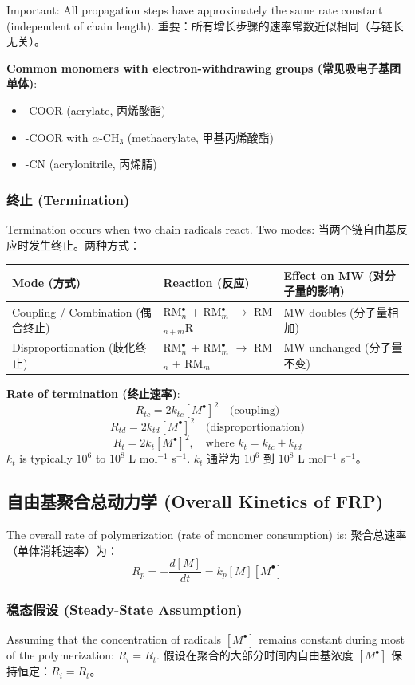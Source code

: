\documentclass[12pt,a4paper]{ctexart}
\begin{document}
Important: All propagation steps have approximately the same rate constant (independent of chain length).  
重要：所有增长步骤的速率常数近似相同（与链长无关）。

\textbf{Common monomers with electron-withdrawing groups (常见吸电子基团单体)}:
\begin{itemize}
    \item -COOR (acrylate, 丙烯酸酯)
    \item -COOR with $\alpha$-CH$_3$ (methacrylate, 甲基丙烯酸酯)
    \item -CN (acrylonitrile, 丙烯腈)
\end{itemize}

\subsubsection{终止 (Termination)}
Termination occurs when two chain radicals react. Two modes:  
当两个链自由基反应时发生终止。两种方式：

\begin{longtable}{p{4cm}p{6cm}p{4cm}}
\toprule
\textbf{Mode (方式)} & \textbf{Reaction (反应)} & \textbf{Effect on MW (对分子量的影响)} \\
\midrule
Coupling / Combination (偶合终止) & RM$_n^\bullet$ + RM$_m^\bullet$ $\rightarrow$ RM$_{n+m}$R & MW doubles (分子量相加) \\
Disproportionation (歧化终止) & RM$_n^\bullet$ + RM$_m^\bullet$ $\rightarrow$ RM$_n$ + RM$_m$ & MW unchanged (分子量不变) \\
\bottomrule
\end{longtable}

\textbf{Rate of termination (终止速率)}:
\[
R_{tc} = 2 k_{tc} [M^\bullet]^2 \quad \text{(coupling)}
\]
\[
R_{td} = 2 k_{td} [M^\bullet]^2 \quad \text{(disproportionation)}
\]
\[
R_t = 2 k_t [M^\bullet]^2, \quad \text{where } k_t = k_{tc} + k_{td}
\]
$k_t$ is typically $10^6$ to $10^8$ L mol$^{-1}$ s$^{-1}$.  
$k_t$ 通常为 $10^6$ 到 $10^8$ L mol$^{-1}$ s$^{-1}$。

\subsection{自由基聚合总动力学 (Overall Kinetics of FRP)}

The overall rate of polymerization (rate of monomer consumption) is:  
聚合总速率（单体消耗速率）为：
\[
R_p = -\frac{d[M]}{dt} = k_p [M] [M^\bullet]
\]

\subsubsection{稳态假设 (Steady-State Assumption)}
Assuming that the concentration of radicals $[M^\bullet]$ remains constant during most of the polymerization: $R_i = R_t$.  
假设在聚合的大部分时间内自由基浓度 $[M^\bullet]$ 保持恒定：$R_i = R_t$。
\end{document}
